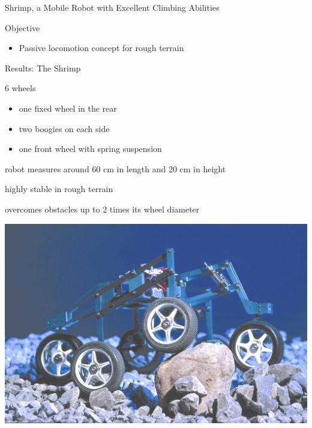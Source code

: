 \documentclass[compress]{beamer}
\begin{document}
\begin{frame}{Shrimp, a Mobile Robot with Excellent Climbing Abilities}

Objective

\begin{itemize}
    \item Passive locomotion concept for rough terrain
\end{itemize}

Results: The Shrimp

6 wheels

\begin{itemize}
    \item one fixed wheel in the rear
    \item two boogies on each side
    \item one front wheel with spring suspension
\end{itemize}

robot measures around 60 cm in length and 20 cm in height

highly stable in rough terrain

overcomes obstacles up to 2 times its wheel diameter

    \begin{center}
        \includegraphics[width=0.8\linewidth]{shrimp}
    \end{center}
\end{frame}
\end{document}

